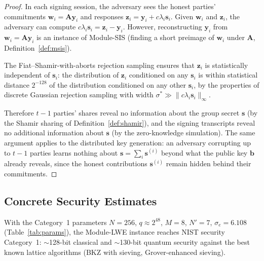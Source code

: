 \begin{proof}
In each signing session, the adversary sees the honest parties' commitments
$\mathbf{w}_i = \mathbf{A}\mathbf{y}_i$ and responses
$\mathbf{z}_i = \mathbf{y}_i + c \lambda_i \mathbf{s}_i$. Given $\mathbf{w}_i$ and
$\mathbf{z}_i$, the adversary can compute $c \lambda_i \mathbf{s}_i = \mathbf{z}_i - \mathbf{y}_i$.
However, reconstructing $\mathbf{y}_i$ from $\mathbf{w}_i = \mathbf{A}\mathbf{y}_i$ is an
instance of Module-SIS (finding a short preimage of $\mathbf{w}_i$ under $\mathbf{A}$,
Definition~\ref{def:msis}).

The Fiat--Shamir-with-aborts rejection sampling ensures that $\mathbf{z}_i$ is
statistically independent of $\mathbf{s}_i$: the distribution of $\mathbf{z}_i$
conditioned on any $\mathbf{s}_i$ is within statistical distance $2^{-128}$ of the
distribution conditioned on any other $\mathbf{s}_i$, by the properties of discrete
Gaussian rejection sampling with width $\sigma^* \gg \|c \lambda_i \mathbf{s}_i\|_\infty$.

Therefore $t-1$ parties' shares reveal no information about the group secret $\mathbf{s}$
(by the Shamir sharing of Definition~\ref{def:shamir}), and the signing transcripts
reveal no additional information about $\mathbf{s}$ (by the zero-knowledge simulation).
The same argument applies to the distributed key generation: an adversary corrupting up
to $t-1$ parties learns nothing about $\mathbf{s} = \sum_i \mathbf{s}^{(i)}$ beyond what
the public key $\mathbf{b}$ already reveals, since the honest contributions
$\mathbf{s}^{(i)}$ remain hidden behind their commitments.
\end{proof}

\subsection{Concrete Security Estimates}
\label{sec:params}

\begin{proposition}
\label{prop:security-level}
With the Category~1 parameters $N = 256$, $q \approx 2^{48}$, $M = 8$, $N' = 7$,
$\sigma_e = 6.108$ (Table~\ref{tab:params}), the Module-LWE instance reaches NIST
security Category~1: $\sim$128-bit classical and $\sim$130-bit quantum security against
the best known lattice algorithms (BKZ with sieving, Grover-enhanced sieving).
\end{proposition}

